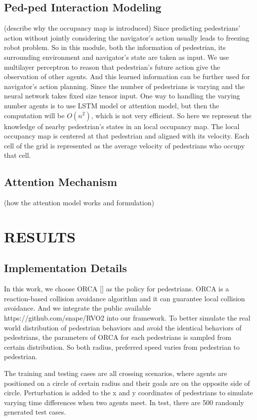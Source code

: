 \documentclass[letterpaper, 10 pt, conference]{ieeeconf}  %
\begin{document}
\subsection{Ped-ped Interaction Modeling}
(describe why the occupancy map is introduced)
Since predicting pedestrians' action without jointly considering the navigator's action usually leads to freezing robot problem. So in this module, both the information of pedestrian, its surrounding environment and navigator's state are taken as input. We use multilayer perceptron to reason that pedestrian's future action give the observation of other agents. And this learned information can be further used for navigator's action planning. Since the number of pedestrians is varying and the neural network takes fixed size tensor input. One way to handling the varying number agents is to use LSTM model or attention model, but then the computation will be $O(n^2)$, which is not very efficient. So here we represent the knowledge of nearby pedestrian's states in an local occupancy map. The local occupancy map is centered at that pedestrian and aligned with its velocity. Each cell of the grid is represented as the average velocity of pedestrians who occupy that cell. 

\subsection{Attention Mechanism}
(how the attention model works and formulation)



\section{RESULTS}

\subsection{Implementation Details}
In this work, we choose ORCA [] as the policy for pedestrians. ORCA is a reaction-based collision avoidance algorithm and it can guarantee local collision avoidance. And we integrate the public available https://github.com/snape/RVO2 into our framework. To better simulate the real world distribution of pedestrian behaviors and avoid the identical behaviors of pedestrians, the parameters of ORCA for each pedestrians is sampled from certain distribution. So both radius, preferred speed varies from pedestrian to pedestrian.

The training and testing cases are all crossing scenarios, where agents are positioned on a circle of certain radius and their goals are on the opposite side of circle. Perturbation is added to the x and y coordinates of pedestrians to simulate varying time differences when two agents meet. In test, there are 500 randomly generated test cases.
\end{document}
